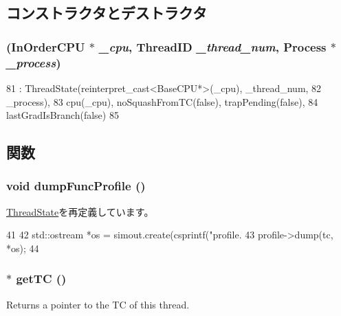 \subsection{コンストラクタとデストラクタ}
\hypertarget{classInOrderThreadState_a26b1b3d55f508e3b095dab2323b9a440}{
\subsubsection[{InOrderThreadState}]{ ({\bf InOrderCPU} $\ast$ {\em \_\-cpu}, \/  {\bf ThreadID} {\em \_\-thread\_\-num}, \/  {\bf Process} $\ast$ {\em \_\-process})}}
\label{classInOrderThreadState_a26b1b3d55f508e3b095dab2323b9a440}



\begin{DoxyCode}
81         : ThreadState(reinterpret_cast<BaseCPU*>(_cpu), _thread_num,
82                       _process),
83           cpu(_cpu), noSquashFromTC(false), trapPending(false),
84           lastGradIsBranch(false)
85     { }
\end{DoxyCode}


\subsection{関数}
\hypertarget{classInOrderThreadState_a13fa12d1779a94a1e0b968946a1367c7}{
\subsubsection[{dumpFuncProfile}]{\setlength{\rightskip}{0pt plus 5cm}void dumpFuncProfile ()}}
\label{classInOrderThreadState_a13fa12d1779a94a1e0b968946a1367c7}


\hyperlink{structThreadState_a13fa12d1779a94a1e0b968946a1367c7}{ThreadState}を再定義しています。


\begin{DoxyCode}
41 {
42     std::ostream *os = simout.create(csprintf("profile.%
43     profile->dump(tc, *os);
44 }
\end{DoxyCode}
\hypertarget{classInOrderThreadState_a81894d15db5190d5364449a4915b76f5}{
\subsubsection[{getTC}]{$\ast$ getTC ()}}
\label{classInOrderThreadState_a81894d15db5190d5364449a4915b76f5}
Returns a pointer to the TC of this thread. 


